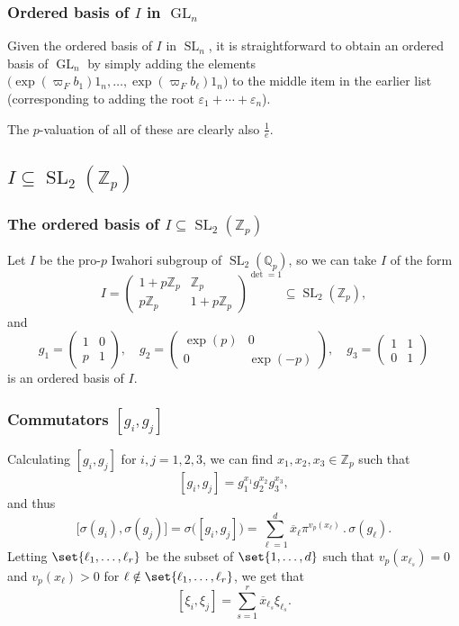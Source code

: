 \documentclass{beamer}
\newcommand*\Z{\mathbb{Z}}
\newcommand*\Q{\mathbb{Q}}
\DeclareMathOperator{\GL}{GL} %
\DeclareMathOperator{\SL}{SL} %
\newcommand*\act{\,.\,} %
\newcommand*\pmat[1]{\begin{pmatrix} #1 \end{pmatrix}}
\begin{document}
\begin{frame}
  \frametitle{Ordered basis of $I$ in $\GL_{n}$}

  Given the ordered basis of $I$ in $\SL_{n}$, it is straightforward to obtain an ordered basis of $\GL_{n}$ by simply adding the elements $\bigl( \exp(\varpi_{F}b_{1})1_{n}, \dotsc, \exp(\varpi_{F}b_{\ell})1_{n} \bigr)$ to the middle item in the earlier list (corresponding to adding the root $\varepsilon_{1} + \dotsb + \varepsilon_{n}$).

  The $p$-valuation of all of these are clearly also $\frac{1}{e}$.
\end{frame}


\subsection{\texorpdfstring{$I \subseteq \SL_{2}(\Z_{p})$}{I in SL2(Zp)}}

\begin{frame}[fragile]
  \frametitle{The ordered basis of $I \subseteq \SL_{2}(\Z_{p})$}

  Let $I$ be the pro-$p$ Iwahori subgroup of $\SL_{2}(\Q_{p})$, so we can take $I$ of the form
  \[
    I = \pmat{ 1+p\Z_{p} & \Z_{p} \\ p\Z_{p} & 1+p\Z_{p} }^{\!\!\det = 1} \subseteq \SL_{2}(\Z_{p}),
  \]
  and
  \[
    g_{1} = \pmat{ 1 & 0 \\ p & 1 }, \quad g_{2} = \pmat{ \exp(p) & 0 \\ 0 & \exp(-p) }, \quad g_{3} = \pmat{ 1 & 1 \\ 0 & 1 }
  \]
  is an ordered basis of $I$.
\end{frame}

\begin{frame}
  \frametitle{Commutators $[g_{i},g_{j}]$}

  Calculating $[g_{i},g_{j}]$ for $i,j=1,2,3$, we can find $x_{1},x_{2},x_{3} \in \Z_{p}$ such that \[ [g_{i},g_{j}] = g_{1}^{x_{1}}g_{2}^{x_{2}}g_{3}^{x_{3}}, \] and thus \[ \bigl[ \sigma(g_{i}),\sigma(g_{j}) \bigr] = \sigma\bigl( [g_{i},g_{j}] \bigr) = \sum_{\ell=1}^{d} \overline{x}_{\ell}\pi^{v_{p}(x_{\ell})} \act \sigma(g_{\ell}). \] Letting $\set{ \ell_{1},\dotsc,\ell_{r} }$ be the subset of $\set{ 1,\dotsc,d }$ such that $v_{p}(x_{\ell_{s}}) = 0$ and $v_{p}(x_{\ell}) > 0$ for $\ell \notin \set{ \ell_{1},\dotsc,\ell_{r} }$, we get that \[ [\xi_{i},\xi_{j}] = \sum_{s=1}^{r} \overline{x}_{\ell_{s}} \xi_{\ell_{s}}. \]
\end{frame}
\end{document}

